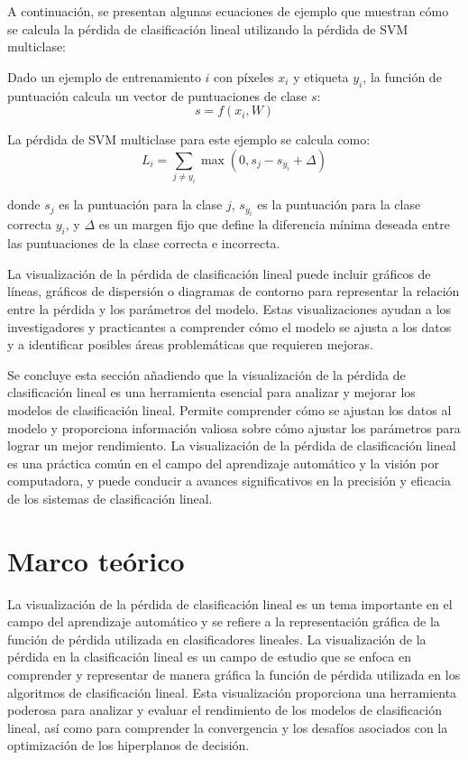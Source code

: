 \documentclass[twoside,10pt]{article}
\numberwithin{equation}{section}
\begin{document}
A continuación, se presentan algunas ecuaciones de ejemplo que muestran cómo se calcula la pérdida de clasificación lineal utilizando la pérdida de SVM multiclase:

Dado un ejemplo de entrenamiento $i$ con píxeles $x_i$ y etiqueta $y_i$, la función de puntuación calcula un vector de puntuaciones de clase $s$:
\begin{equation}
s = f(x_i, W)
\end{equation}

La pérdida de SVM multiclase para este ejemplo se calcula como:
\begin{equation}
L_i = \sum_{j \neq y_i} \max(0, s_j - s_{y_i} + \Delta)
\end{equation}

donde $s_j$ es la puntuación para la clase $j$, $s_{y_i}$ es la puntuación para la clase correcta $y_i$, y $\Delta$ es un margen fijo que define la diferencia mínima deseada entre las puntuaciones de la clase correcta e incorrecta.

La visualización de la pérdida de clasificación lineal puede incluir gráficos de líneas, gráficos de dispersión o diagramas de contorno para representar la relación entre la pérdida y los parámetros del modelo. Estas visualizaciones ayudan a los investigadores y practicantes a comprender cómo el modelo se ajusta a los datos y a identificar posibles áreas problemáticas que requieren mejoras.

Se concluye esta sección añadiendo que la visualización de la pérdida de clasificación lineal es una herramienta esencial para analizar y mejorar los modelos de clasificación lineal. Permite comprender cómo se ajustan los datos al modelo y proporciona información valiosa sobre cómo ajustar los parámetros para lograr un mejor rendimiento. La visualización de la pérdida de clasificación lineal es una práctica común en el campo del aprendizaje automático y la visión por computadora, y puede conducir a avances significativos en la precisión y eficacia de los sistemas de clasificación lineal.




\section{Marco teórico}

La visualización de la pérdida de clasificación lineal es un tema importante en el campo del aprendizaje automático y se refiere a la representación gráfica de la función de pérdida utilizada en clasificadores lineales.
La visualización de la pérdida en la clasificación lineal es un campo de estudio que se enfoca en comprender y representar de manera gráfica la función de pérdida utilizada en los algoritmos de clasificación lineal. Esta visualización proporciona una herramienta poderosa para analizar y evaluar el rendimiento de los modelos de clasificación lineal, así como para comprender la convergencia y los desafíos asociados con la optimización de los hiperplanos de decisión. \cite{Linear-Classification-Loss}
\end{document}
